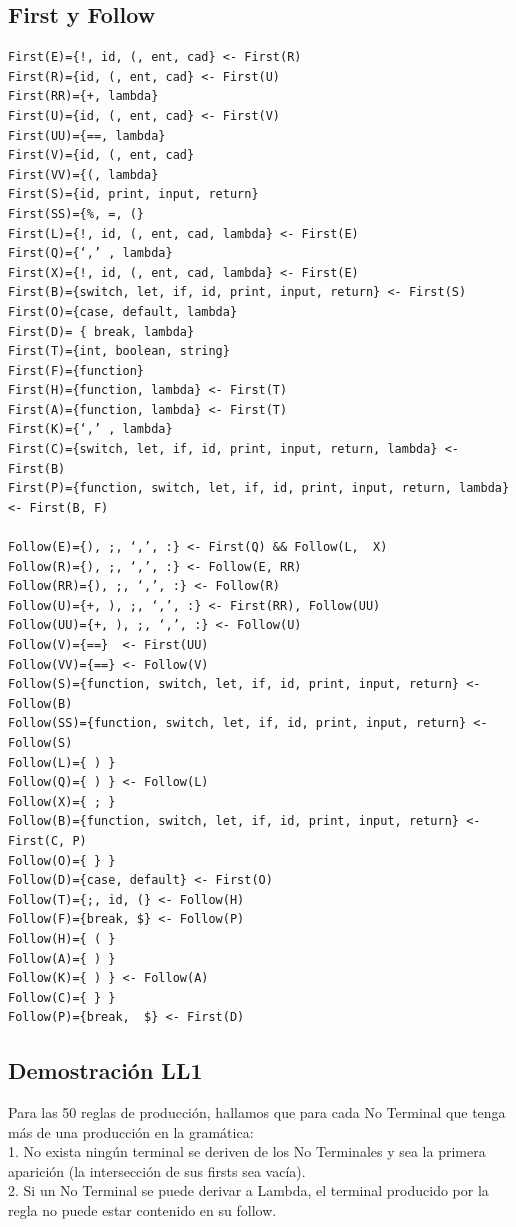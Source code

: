 \documentclass{article}[a4paper]
\begin{document}
\subsection{First y Follow}
\begin{verbatim}
First(E)={!, id, (, ent, cad} <- First(R)
First(R)={id, (, ent, cad} <- First(U)
First(RR)={+, lambda}  
First(U)={id, (, ent, cad} <- First(V)
First(UU)={==, lambda}
First(V)={id, (, ent, cad}
First(VV)={(, lambda}
First(S)={id, print, input, return}
First(SS)={%, =, (}
First(L)={!, id, (, ent, cad, lambda} <- First(E)
First(Q)={‘,’ , lambda}
First(X)={!, id, (, ent, cad, lambda} <- First(E)
First(B)={switch, let, if, id, print, input, return} <- First(S)
First(O)={case, default, lambda}
First(D)= { break, lambda}
First(T)={int, boolean, string}
First(F)={function}
First(H)={function, lambda} <- First(T)
First(A)={function, lambda} <- First(T)
First(K)={‘,’ , lambda}
First(C)={switch, let, if, id, print, input, return, lambda} <- First(B)
First(P)={function, switch, let, if, id, print, input, return, lambda} <- First(B, F)

Follow(E)={), ;, ‘,’, :} <- First(Q) && Follow(L,  X)
Follow(R)={), ;, ‘,’, :} <- Follow(E, RR)
Follow(RR)={), ;, ‘,’, :} <- Follow(R)
Follow(U)={+, ), ;, ‘,’, :} <- First(RR), Follow(UU)
Follow(UU)={+, ), ;, ‘,’, :} <- Follow(U)
Follow(V)={==}  <- First(UU) 
Follow(VV)={==} <- Follow(V) 
Follow(S)={function, switch, let, if, id, print, input, return} <- Follow(B)
Follow(SS)={function, switch, let, if, id, print, input, return} <- Follow(S)
Follow(L)={ ) }
Follow(Q)={ ) } <- Follow(L)
Follow(X)={ ; }
Follow(B)={function, switch, let, if, id, print, input, return} <- First(C, P)
Follow(O)={ } }
Follow(D)={case, default} <- First(O)
Follow(T)={;, id, (} <- Follow(H)
Follow(F)={break, $} <- Follow(P)
Follow(H)={ ( }
Follow(A)={ ) } 
Follow(K)={ ) } <- Follow(A)
Follow(C)={ } }
Follow(P)={break,  $} <- First(D)
\end{verbatim}

\subsection{Demostración LL1}
Para las 50 reglas de producción, hallamos que para cada No Terminal que tenga más de una producción en la gramática:\\
1. No exista ningún terminal se deriven de los No Terminales y sea la primera aparición (la intersección de sus firsts sea vacía).\\
2. Si un No Terminal se puede derivar a Lambda, el terminal producido por la regla no puede estar contenido en su follow.\\
\end{document}
